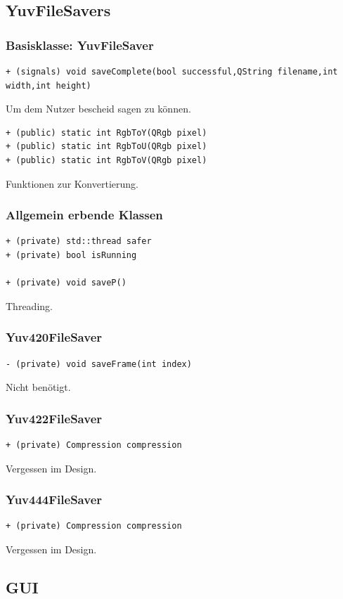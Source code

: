 \documentclass{scrartcl}
\begin{document}
{\subsection{YuvFileSavers}
\subsubsection{Basisklasse: YuvFileSaver}
\begin{verbatim}
+ (signals) void saveComplete(bool successful,QString filename,int width,int height)
\end{verbatim}
Um dem Nutzer bescheid sagen zu können.
\bigskip
\begin{verbatim}
+ (public) static int RgbToY(QRgb pixel)
+ (public) static int RgbToU(QRgb pixel)
+ (public) static int RgbToV(QRgb pixel)
\end{verbatim}
Funktionen zur Konvertierung.
\bigskip
\subsubsection{Allgemein erbende Klassen}
\begin{verbatim}
+ (private) std::thread safer
+ (private) bool isRunning

+ (private) void saveP()
\end{verbatim}
Threading.
\bigskip
\subsubsection{Yuv420FileSaver}
\begin{verbatim}
- (private) void saveFrame(int index)
\end{verbatim}
Nicht benötigt.
\bigskip
\subsubsection{Yuv422FileSaver}
\begin{verbatim}
+ (private) Compression compression
\end{verbatim}
Vergessen im Design.
\subsubsection{Yuv444FileSaver}
\begin{verbatim}
+ (private) Compression compression
\end{verbatim}
Vergessen im Design.
\newpage
\subsection{GUI}
}
\end{document}
